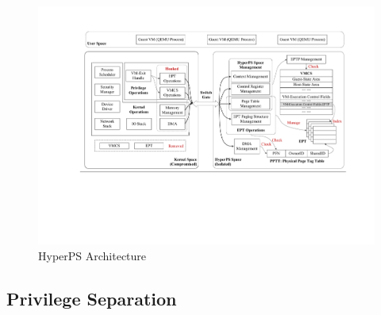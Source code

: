 \begin{figure}[htpb]
    \centering
    \includegraphics[width=0.9\linewidth]{IMG/design.pdf}
    \caption{HyperPS Architecture}%
    \label{fig:design}
\end{figure}

\subsection{Privilege Separation}%
\label{sub:privilege_separation}

